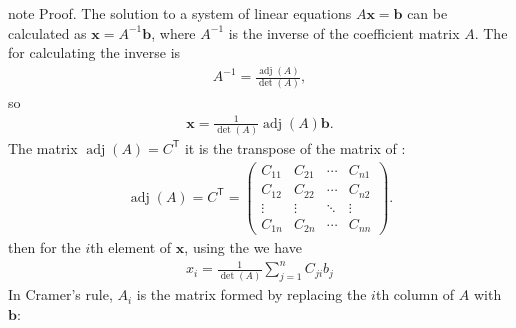\documentclass[letterpaper,10pt,english]{jupyterBook}
\begin{document}
\begin{sphinxadmonition}{note}
\sphinxAtStartPar
Proof. The solution to a system of linear equations \(A \mathbf{x} = \mathbf{b}\) can be calculated as \(\mathbf{x} = A^{-1} \mathbf{b}\), where \(A^{-1}\) is the inverse of the coefficient matrix \(A\). The {\hyperref[\detokenize{_pages/1.5_Inverse_matrix:adjoint-determinant-formula-theorem}]{}} for calculating the inverse is
\begin{equation*}
\begin{split} A^{-1} = \frac{\operatorname{adj}(A)}{\det(A)}, \end{split}
\end{equation*}
\sphinxAtStartPar
so
\begin{equation*}
\begin{split} \mathbf{x} = \frac{1}{\det(A)} \operatorname{adj}(A) \mathbf{b}. \end{split}
\end{equation*}
\sphinxAtStartPar
The matrix \(\operatorname{adj}(A) = C^\mathsf{T}\) \sphinxhyphen{} it is the transpose of the matrix of {\hyperref[\detokenize{_pages/1.4_Determinants:cofactor-definition}]{}}:
\begin{equation*}
\begin{split} \operatorname{adj}(A) = C^\mathsf{T} = \begin{pmatrix}
    C_{11} & C_{21} & \cdots & C_{n1} \\
    C_{12} & C_{22} & \cdots & C_{n2} \\
    \vdots & \vdots & \ddots & \vdots \\
    C_{1n} & C_{2n} & \cdots & C_{nn}
\end{pmatrix}. \end{split}
\end{equation*}
\sphinxAtStartPar
then for the \(i\)th element of \(\mathbf{x}\), using the {\hyperref[\detokenize{_pages/1.2_Matrix_multiplication:matrix-multiplication-definition}]{}} we have
\begin{equation*}
\begin{split} x_i = \frac{1}{\det(A)} \sum_{j=1}^n C_{ji} b_j \end{split}
\end{equation*}
\sphinxAtStartPar
In Cramer’s rule, \(A_i\) is the matrix formed by replacing the \(i\)th column of \(A\) with \(\mathbf{b}\):
\begin{equation*}

\end{equation*}
\end{sphinxadmonition}
\end{document}
